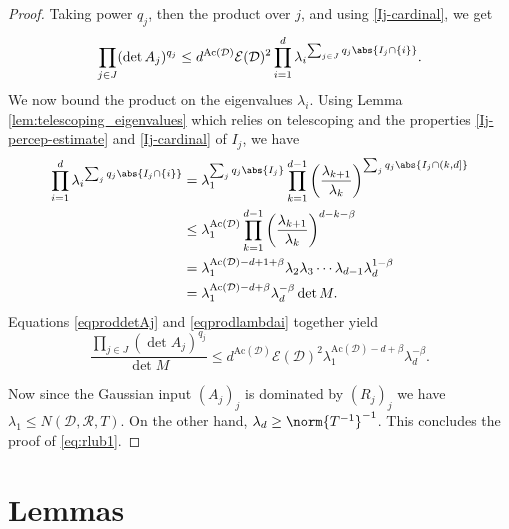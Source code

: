 \begin{proof}
Taking power $q_{j}$, then the product over $j$, and using \eqref{Ij-cardinal}, we get
\begin{equation} \label{eqproddetAj}
\prod_{j\in J} (\det A_{j})^{q_{j}} \leq
d^{\mathrm{Ac}(\mathcal{D})}\mathcal{E}(\mathcal{D})^2
\prod_{i=1}^d{\lambda_{i}}^{\sum_{j \in J} q_{j}\abs{I_{j}\cap \{i\}}}.
\end{equation}
We now bound the product on the eigenvalues $\lambda_{i}$.
Using Lemma \ref{lem:telescoping_eigenvalues} which relies on telescoping and the properties \eqref{Ij-percep-estimate} and \eqref{Ij-cardinal} of $I_{j}$, we have
\begin{align}
 \prod_{i=1}^d{\lambda_{i}}^{\sum_{j}q_{j}\abs{I_{j} \cap \{i\}}}
 &= \lambda_{1}^{\sum_{j}q_{j}\abs{I_j}}\prod_{k=1}^{d-1} \left(\frac{\lambda_{k+1}}{\lambda_k}\right)^{\sum_{j}q_{j}\abs{I_{j}\cap (k,d]} } \nonumber\\
 &\leq \lambda_{1}^{\mathrm{Ac}(\mathcal{D})}\prod_{k=1}^{d-1} \left(\frac{\lambda_{k+1}}{\lambda_k}\right)^{d-k-\beta} \nonumber\\
 &=\lambda_{1}^{\mathrm{Ac}(\mathcal{D})-d+1+\beta} \lambda_{2}\lambda_{3}\dotsm \lambda_{d-1} \lambda_{d}^{1-\beta} \nonumber\\
 &= \lambda_{1}^{\mathrm{Ac}(\mathcal{D})-d+\beta} \lambda_{d}^{-\beta}  \det M. \label{eqprodlambdai}
 \end{align}
Equations \eqref{eqproddetAj} and \eqref{eqprodlambdai} together yield
$$
\frac{\prod_{j\in J} (\det A_{j})^{q_{j}} }{{\det M}}\leq d^{\mathrm{Ac}(\mathcal{D})}\mathcal{E}(\mathcal{D})^2
\lambda_{1}^{\mathrm{Ac}(\mathcal{D})-d+\beta} \lambda_{d}^{-\beta}.
$$

Now since the Gaussian input $(A_j)_j$ is dominated by $(R_j)_j$
we have $\lambda_{1}\leq N(\mathcal{D}, \mathcal{R}, T)$.
On the other hand, $\lambda_{d} \geq \norm{T^{-1}}^{-1}$.
This concludes the proof of \eqref{eq:rlub1}.
\end{proof}

\section{Lemmas}

